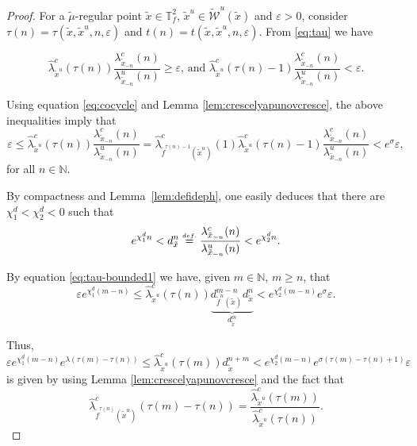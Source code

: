 \documentclass[a4paper,11pt,reqno]{amsart}
\newcommand{\TTf}{{\mathbb{T}_f^2}}
\newcommand{\cW}{{\mathcal W}}
\newcommand{\eqdef}{\stackrel{\scriptscriptstyle\textrm def.}{=}}
\newcommand{\tix}{\tilde{x}}
\newcommand{\w}{\widetilde{\cW}}
\theoremstyle{definition}
\begin{document}
\begin{proof}
    For a $\tilde{\mu}$-regular point $\tix \in \TTf$, $\tix^u \in \w^u(\tix)$ and $\varepsilon > 0$, consider $\tau(n) = \tau(\tix, \tix^u, n, \varepsilon)$ and $t(n) = t(\tix, \tix^u, n, \varepsilon)$. From \eqref{eq:tau} we have

    $$\hat{\lambda}^c_{\tix^u}(\tau(n)) \frac{\lambda^c_{\tix_{-n}}(n)}{\lambda^u_{\tix_{-n}}(n)} \geq \varepsilon \mbox{, and } \hat{\lambda}^c_{\tix^u}(\tau(n)-1) \frac{\lambda^c_{\tix_{-n}}(n)}{\lambda^u_{\tix_{-n}}(n)} < \varepsilon.$$

    Using equation \eqref{eq:cocycle} and Lemma \ref{lem:crescelyapunovcresce}, the above inequalities imply that
    \begin{equation}
        \label{eq:tau-bounded1}
        \varepsilon \leq \hat{\lambda}^c_{\tix^u}(\tau(n)) \frac{\lambda^c_{\tix_{-n}}(n)}{\lambda^u_{\tix_{-n}}(n)} = \hat{\lambda}^c_{\tilde{f}^{\tau(n) - 1}(\tix^u)}(1) \hat{\lambda}^c_{\tix^u}(\tau(n) - 1) \frac{\lambda^c_{\tix_{-n}}(n)}{\lambda^u_{\tix_{-n}}(n)} < e^\sigma \varepsilon,
    \end{equation}
    for all $n \in \mathbb{N}$.

    By compactness and Lemma~\ref{lem:defideph}, one easily deduces that there are $\chi_1^d < \chi_2^d < 0$ such that $$e^{\chi_1^dn} < d^n_{\tix} \eqdef \frac{\lambda^c_{\tix_{-n}}(n)}{\lambda^u_{\tix_{-n}}(n)} < e^{\chi_2^dn}.$$
    
    By equation \eqref{eq:tau-bounded1} we have, given $m \in \mathbb{N}$, $m \geq n$, that
    $$\varepsilon e^{\chi_1^d(m-n)} \leq \hat{\lambda}^c_{\tix^u}(\tau(n)) \underbrace{d^{m-n}_{\tilde{f}^{n}(\tix)}d^{n}_{\tix}}_{d^{m}_{\tix}} < e^{\chi_2^d(m-n)} e^\sigma \varepsilon.$$
    
    Thus,
    \begin{equation}
        \label{eq:tau-bounded2}
        \varepsilon e^{\chi_1^d(m-n)} e^{\lambda(\tau(m) - \tau(n))} \leq \hat{\lambda}^c_{\tix^u}(\tau(m)) d^{n+m}_{\tix} < e^{\chi_2^d(m-n)} e^{\sigma(\tau(m) - \tau(n) + 1)} \varepsilon
    \end{equation}
    is given by using Lemma \ref{lem:crescelyapunovcresce} and the fact that
    $$\hat{\lambda}^c_{\tilde{f}^{\tau(n)}(\tix^u)}(\tau(m) - \tau(n)) = \dfrac{\hat{\lambda}^c_{\tix^u}(\tau(m))}{\hat{\lambda}^c_{\tix^u}(\tau(n))}.$$


\end{proof}
\end{document}

